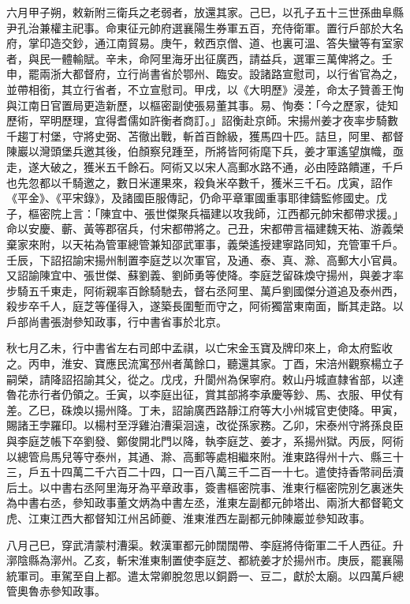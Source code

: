 \begin{pinyinscope}
 六月甲子朔，敕新附三衛兵之老弱者，放還其家。己巳，以孔子五十三世孫曲阜縣尹孔治兼權主祀事。命東征元帥府選襄陽生券軍五百，充侍衛軍。置行戶部於大名府，掌印造交鈔，通江南貿易。庚午，敕西京僧、道、也裏可溫、答失蠻等有室家者，與民一體輸賦。辛未，命阿里海牙出征廣西，請益兵，選軍三萬俾將之。壬申，罷兩浙大都督府，立行尚書省於鄂州、臨安。設諸路宣慰司，以行省官為之，並帶相銜，其立行省者，不立宣慰司。甲戌，以《大明歷》浸差，命太子贊善王恂與江南日官置局更造新歷，以樞密副使張易董其事。易、恂奏：「今之歷家，徒知歷術，罕明歷理，宜得耆儒如許衡者商訂。」詔衡赴京師。宋揚州姜才夜率步騎數千趨丁村堡，守將史弼、苫徹出戰，斬首百餘級，獲馬四十匹。詰旦，阿里、都督陳巖以灣頭堡兵邀其後，伯顏察兒踵至，所將皆阿術麾下兵，姜才軍遙望旗幟，亟走，遂大破之，獲米五千餘石。阿術又以宋人高郵水路不通，必由陸路饋運，千戶也先忽都以千騎邀之，數日米運果來，殺負米卒數千，獲米三千石。戊寅，詔作《平金》、《平宋錄》，及諸國臣服傳記，仍命平章軍國重事耶律鑄監修國史。戊子，樞密院上言：「陳宜中、張世傑聚兵福建以攻我師，江西都元帥宋都帶求援。」命以安慶、蘄、黃等郡宿兵，付宋都帶將之。己丑，宋都帶言福建魏天祐、游義榮棄家來附，以天祐為管軍總管兼知邵武軍事，義榮遙授建寧路同知，充管軍千戶。壬辰，下詔招諭宋揚州制置李庭芝以次軍官，及通、泰、真、滁、高郵大小官員。又詔諭陳宜中、張世傑、蘇劉義、劉師勇等使降。李庭芝留硃煥守揚州，與姜才率步騎五千東走，阿術親率百餘騎馳去，督右丞阿里、萬戶劉國傑分道追及泰州西，殺步卒千人，庭芝等僅得入，遂築長圍塹而守之，阿術獨當東南面，斷其走路。以戶部尚書張澍參知政事，行中書省事於北京。



 秋七月乙未，行中書省左右司郎中孟祺，以亡宋金玉寶及牌印來上，命太府監收之。丙申，淮安、寶應民流寓邳州者萬餘口，聽還其家。丁酉，宋涪州觀察楊立子嗣榮，請降詔招諭其父，從之。戊戌，升閬州為保寧府。敕山丹城直隸省部，以達魯花赤行者仍領之。壬寅，以李庭出征，賞其部將李承慶等鈔、馬、衣服、甲仗有差。乙巳，硃煥以揚州降。丁未，詔諭廣西路靜江府等大小州城官吏使降。甲寅，賜諸王孛羅印。以楊村至浮雞泊漕渠洄遠，改從孫家務。乙卯，宋泰州守將孫良臣與李庭芝帳下卒劉發、鄭俊開北門以降，執李庭芝、姜才，系揚州獄。丙辰，阿術以總管烏馬兒等守泰州，其通、滁、高郵等處相繼來附。淮東路得州十六、縣三十三，戶五十四萬二千六百二十四，口一百八萬三千二百一十七。遣使持香幣祠岳瀆后土。以中書右丞阿里海牙為平章政事，簽書樞密院事、淮東行樞密院別乞裏迷失為中書右丞，參知政事董文炳為中書左丞，淮東左副都元帥塔出、兩浙大都督範文虎、江東江西大都督知江州呂師夔、淮東淮西左副都元帥陳巖並參知政事。



 八月己巳，穿武清蒙村漕渠。敕漢軍都元帥闊闊帶、李庭將侍衛軍二千人西征。升漷陰縣為漷州。乙亥，斬宋淮東制置使李庭芝、都統姜才於揚州市。庚辰，罷襄陽統軍司。車駕至自上都。遣太常卿脫忽思以銅爵一、豆二，獻於太廟。以四萬戶總管奧魯赤參知政事。




\end{pinyinscope}
